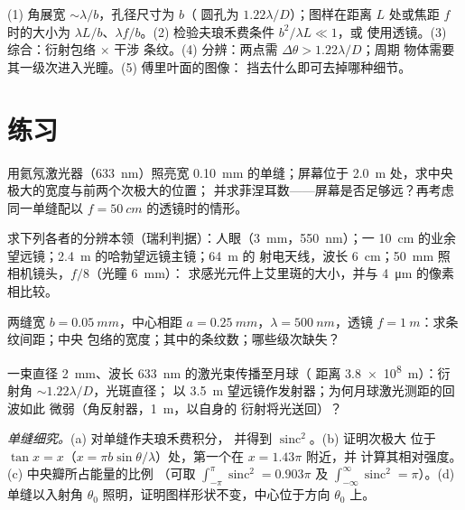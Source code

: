 \begin{method}[衍射的数量估算]\label{met:b2:diffraction:method}
(1) 角展宽 $\sim\lambda/b$，孔径尺寸为 $b$（
圆孔为 $1.22\lambda/D$）；图样在距离 $L$ 处或焦距 $f$ 时的大小为
$\lambda L/b$、$\lambda f/b$。(2) 检验夫琅禾费条件 $b^2/\lambda L \ll 1$，或
使用透镜。(3) 综合：衍射包络 $\times$ 干涉
条纹。(4) 分辨：两点需 $\Delta\theta > 1.22\lambda/D$；周期
物体需要其一级次进入光瞳。(5) 傅里叶面的图像：
挡去什么即可去掉哪种细节。
\end{method}

\section{练习}

\begin{exercise}[$\star$]\label{exo:b2:diffraction:1}
用氦氖激光器（\qty{633}{nm}）照亮宽 \qty{0.10}{mm} 的单缝；屏幕位于
\qty{2.0}{m} 处，求中央极大的宽度与前两个次极大的位置；
并求菲涅耳数——屏幕是否足够远？再考虑
同一单缝配以 $f = \qty{50}{cm}$ 的透镜时的情形。
\end{exercise}

\begin{exercise}[$\star$]\label{exo:b2:diffraction:2}
求下列各者的分辨本领（瑞利判据）：人眼（\qty{3}{mm}，\qty{550}{nm}）；一
\qty{10}{cm} 的业余望远镜；\qty{2.4}{m} 的哈勃望远镜主镜；\qty{64}{m} 的
射电天线，波长 \qty{6}{cm}；\qty{50}{mm} 照相机镜头，$f/8$（光瞳 \qty{6}{mm}）：
求感光元件上艾里斑的大小，并与 \qty{4}{\micro m} 的像素相比较。
\end{exercise}

\begin{exercise}[$\star$]\label{exo:b2:diffraction:3}
两缝宽 $b = \qty{0.05}{mm}$，中心相距 $a = \qty{0.25}{mm}$，$\lambda =
\qty{500}{nm}$，透镜 $f = \qty{1}{m}$：求条纹间距；中央
包络的宽度；其中的条纹数；哪些级次缺失？
\end{exercise}

\begin{exercise}[$\star$]\label{exo:b2:diffraction:4}
一束直径 \qty{2}{mm}、波长 \qty{633}{nm} 的激光束传播至月球（
距离 \qty{3.8e8}{m}）：衍射角 $\sim1.22\lambda/D$，光斑直径；
以 \qty{3.5}{m} 望远镜作发射器；为何月球激光测距的回波如此
微弱（角反射器，\qty{1}{m}，以自身的
衍射将光送回）？
\end{exercise}

\begin{exercise}[$\star\star$]\label{exo:b2:diffraction:5}
\emph{单缝细究。}(a) 对单缝作夫琅禾费积分，
并得到 $\operatorname{sinc}^2$。(b) 证明次极大
位于 $\tan x = x$（$x = \pi b\sin\theta/\lambda$）处，第一个在 $x = 1.43\pi$ 附近，并
计算其相对强度。(c) 中央瓣所占能量的比例
（可取 $\int_{-\pi}^\pi\operatorname{sinc}^2 = 0.903\pi$ 及
$\int_{-\infty}^\infty\operatorname{sinc}^2 = \pi$）。(d) 单缝以入射角
$\theta_0$ 照明，证明图样形状不变，中心位于方向 $\theta_0$ 上。
\end{exercise}

